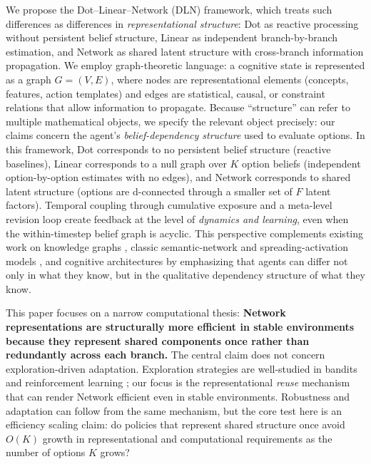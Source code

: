 \documentclass[11pt]{article}
\begin{document}
We propose the Dot--Linear--Network (DLN) framework, which treats such differences as differences in \emph{representational structure}: Dot as reactive processing without persistent belief structure, Linear as independent branch-by-branch estimation, and Network as shared latent structure with cross-branch information propagation. We employ graph-theoretic language: a cognitive state is represented as a graph $G=(V,E)$, where nodes are representational elements (concepts, features, action templates) and edges are statistical, causal, or constraint relations that allow information to propagate. Because ``structure'' can refer to multiple mathematical objects, we specify the relevant object precisely: our claims concern the agent's \emph{belief-dependency structure} used to evaluate options. In this framework, Dot corresponds to no persistent belief structure (reactive baselines), Linear corresponds to a null graph over $K$ option beliefs (independent option-by-option estimates with no edges), and Network corresponds to shared latent structure (options are d-connected through a smaller set of $F$ latent factors). Temporal coupling through cumulative exposure and a meta-level revision loop create feedback at the level of \emph{dynamics and learning}, even when the within-timestep belief graph is acyclic. This perspective complements existing work on knowledge graphs \cite{Hogan2021}, classic semantic-network and spreading-activation models \cite{CollinsLoftus1975,Anderson1983}, and cognitive architectures \cite{ACTR2004,Laird2012} by emphasizing that agents can differ not only in what they know, but in the qualitative dependency structure of what they know.

This paper focuses on a narrow computational thesis: \textbf{Network representations are structurally more efficient in stable environments because they represent shared components once rather than redundantly across each branch.} The central claim does not concern exploration-driven adaptation. Exploration strategies are well-studied in bandits and reinforcement learning \cite{Gershman2018,RussoBandits2018,SuttonBarto2018}; our focus is the representational \emph{reuse} mechanism that can render Network efficient even in stable environments. Robustness and adaptation can follow from the same mechanism, but the core test here is an efficiency scaling claim: do policies that represent shared structure once avoid $O(K)$ growth in representational and computational requirements as the number of options $K$ grows?
\end{document}
